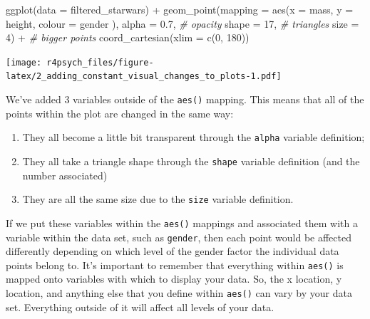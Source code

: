 \documentclass[
]{book}
\newenvironment{Shaded}{\begin{snugshade}}{\end{snugshade}}
\newcommand{\AttributeTok}[1]{\textcolor[rgb]{0.77,0.63,0.00}{#1}}
\newcommand{\CommentTok}[1]{\textcolor[rgb]{0.56,0.35,0.01}{\textit{#1}}}
\newcommand{\DecValTok}[1]{\textcolor[rgb]{0.00,0.00,0.81}{#1}}
\newcommand{\FloatTok}[1]{\textcolor[rgb]{0.00,0.00,0.81}{#1}}
\newcommand{\FunctionTok}[1]{\textcolor[rgb]{0.00,0.00,0.00}{#1}}
\newcommand{\NormalTok}[1]{#1}
\newcommand{\SpecialCharTok}[1]{\textcolor[rgb]{0.00,0.00,0.00}{#1}}
\providecommand{\tightlist}{%
  \setlength{\itemsep}{0pt}\setlength{\parskip}{0pt}}
\begin{document}
\begin{Shaded}
\begin{Highlighting}[]
\FunctionTok{ggplot}\NormalTok{(}\AttributeTok{data =}\NormalTok{ filtered\_starwars) }\SpecialCharTok{+}
  \FunctionTok{geom\_point}\NormalTok{(}\AttributeTok{mapping =} \FunctionTok{aes}\NormalTok{(}\AttributeTok{x =}\NormalTok{ mass, }
                           \AttributeTok{y =}\NormalTok{ height, }
                           \AttributeTok{colour =}\NormalTok{ gender}
\NormalTok{                           ),}
             \AttributeTok{alpha =} \FloatTok{0.7}\NormalTok{, }\CommentTok{\# opacity}
             \AttributeTok{shape =} \DecValTok{17}\NormalTok{, }\CommentTok{\# triangles}
             \AttributeTok{size =} \DecValTok{4}\NormalTok{) }\SpecialCharTok{+} \CommentTok{\# bigger points}
  \FunctionTok{coord\_cartesian}\NormalTok{(}\AttributeTok{xlim =} \FunctionTok{c}\NormalTok{(}\DecValTok{0}\NormalTok{, }\DecValTok{180}\NormalTok{))}
\end{Highlighting}
\end{Shaded}

\texttt{[image: r4psych\_files/figure-latex/2\_adding\_constant\_visual\_changes\_to\_plots-1.pdf]}

We've added 3 variables outside of the \texttt{aes()} mapping. This means that all of the points within the plot are changed in the same way:

\begin{enumerate}
\def\labelenumi{\arabic{enumi}.}
\tightlist
\item
  They all become a little bit transparent through the \texttt{alpha} variable definition;
\item
  They all take a triangle shape through the \texttt{shape} variable definition (and the number associated)
\item
  They are all the same size due to the \texttt{size} variable definition.
\end{enumerate}

If we put these variables within the \texttt{aes()} mappings and associated them with a variable within the data set, such as \texttt{gender}, then each point would be affected differently depending on which level of the gender factor the individual data points belong to. It's important to remember that everything within \texttt{aes()} is mapped onto variables with which to display your data. So, the x location, y location, and anything else that you define within \texttt{aes()} can vary by your data set. Everything outside of it will affect all levels of your data.
\end{document}
